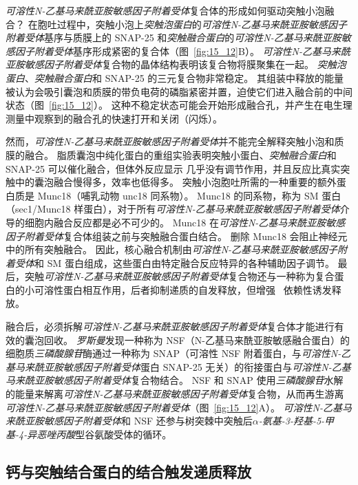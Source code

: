 \textit{可溶性N-乙基马来酰亚胺敏感因子附着受体}复合体的形成如何驱动突触小泡融合？
在胞吐过程中，突触小泡上\textit{突触泡蛋白}的\textit{可溶性N-乙基马来酰亚胺敏感因子附着受体}基序与质膜上的 SNAP-25 和\textit{突触融合蛋白}的\textit{可溶性N-乙基马来酰亚胺敏感因子附着受体}基序形成紧密的复合体（图~\ref{fig:15_12}B）。
\textit{可溶性N-乙基马来酰亚胺敏感因子附着受体}复合物的晶体结构表明该复合物将膜聚集在一起。
\textit{突触泡蛋白}、\textit{突触融合蛋白}和 SNAP-25 的三元复合物非常稳定。
其组装中释放的能量被认为会吸引囊泡和质膜的带负电荷的磷脂紧密并置，迫使它们进入融合前的中间状态（图~\ref{fig:15_12}）。
这种不稳定状态可能会开始形成融合孔，并产生在电生理测量中观察到的融合孔的快速打开和关闭（闪烁）。


然而，\textit{可溶性N-乙基马来酰亚胺敏感因子附着受体}并不能完全解释突触小泡和质膜的融合。
脂质囊泡中纯化蛋白的重组实验表明突触小蛋白、\textit{突触融合蛋白}和 SNAP-25 可以催化融合，但体外反应显示  几乎没有调节作用，并且反应比真实突触中的囊泡融合慢得多，效率也低得多。
突触小泡胞吐所需的一种重要的额外蛋白质是 Munc18（哺乳动物 unc18 同系物）。 
Munc18 的同系物，称为 SM 蛋白（sec1/Munc18 样蛋白），对于所有\textit{可溶性N-乙基马来酰亚胺敏感因子附着受体}介导的细胞内融合反应都是必不可少的。
Munc18 在\textit{可溶性N-乙基马来酰亚胺敏感因子附着受体}复合体组装之前与突触融合蛋白结合。
删除 Munc18 会阻止神经元中的所有突触融合。
因此，核心融合机制由\textit{可溶性N-乙基马来酰亚胺敏感因子附着受体}和 SM 蛋白组成，这些蛋白由特定融合反应特异的各种辅助因子调节。
最后，突触\textit{可溶性N-乙基马来酰亚胺敏感因子附着受体}复合物还与一种称为复合蛋白的小可溶性蛋白相互作用，后者抑制递质的自发释放，但增强~ 依赖性诱发释放。


融合后，必须拆解\textit{可溶性N-乙基马来酰亚胺敏感因子附着受体}复合体才能进行有效的囊泡回收。
\textit{罗斯曼}发现一种称为 NSF（N-乙基马来酰亚胺敏感融合蛋白）的细胞质\textit{三磷酸腺苷}酶通过一种称为 SNAP（可溶性 NSF 附着蛋白，与\textit{可溶性N-乙基马来酰亚胺敏感因子附着受体}蛋白 SNAP-25 无关）的衔接蛋白与\textit{可溶性N-乙基马来酰亚胺敏感因子附着受体}复合物结合。
NSF 和 SNAP 使用\textit{三磷酸腺苷}水解的能量来解离\textit{可溶性N-乙基马来酰亚胺敏感因子附着受体}复合物，从而再生游离\textit{可溶性N-乙基马来酰亚胺敏感因子附着受体}（图~\ref{fig:15_12}A）。
\textit{可溶性N-乙基马来酰亚胺敏感因子附着受体}和 NSF 还参与树突棘中突触后\textit{$\alpha$-氨基-3-羟基-5-甲基-4-异恶唑丙酸}型谷氨酸受体的循环。



\subsection{钙与突触结合蛋白的结合触发递质释放}

